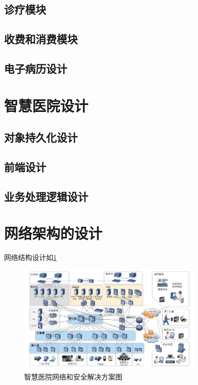 \documentclass[doctor,secret]{thuthesis}
\begin{document}
\subsection{诊疗模块}
\label{sec:orga3f3817}
\subsection{收费和消费模块}
\label{sec:org7c2a574}
\subsection{电子病历设计}
\label{sec:org189c068}
\section{智慧医院设计}
\label{sec:orgafa0baf}
\subsection{对象持久化设计}
\label{sec:org1ba75b3}
\subsection{前端设计}
\label{sec:org4a6fe2d}
\subsection{业务处理逻辑设计}
\label{sec:org5f05dca}
\section{网络架构的设计}
\label{sec:org18e5bc2}
网络结构设计如\ref{fig:networkscheme}

\begin{figure}[htbp]
\centering
\includegraphics[width=0.8\textwidth]{figures/network.pdf}
\caption{智慧医院网络和安全解决方案图 \label{fig:networkscheme}}
\end{figure}
\end{document}
